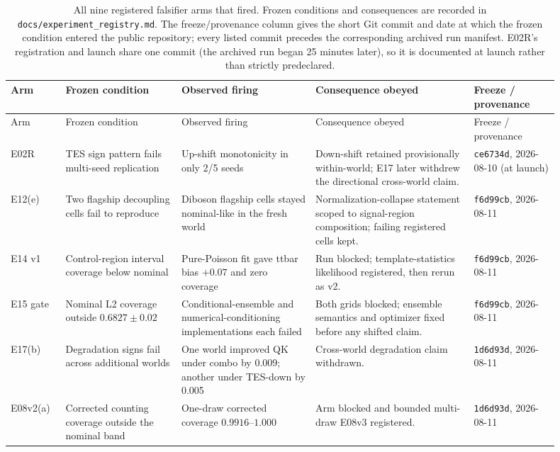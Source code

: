 \documentclass[11pt,a4paper]{article}
\begin{document}
\footnotesize
\begin{longtable}{@{}>{\raggedright\arraybackslash}p{0.09\linewidth}>{\raggedright\arraybackslash}p{0.19\linewidth}>{\raggedright\arraybackslash}p{0.22\linewidth}>{\raggedright\arraybackslash}p{0.26\linewidth}>{\raggedright\arraybackslash}p{0.14\linewidth}@{}}
\caption{All nine registered falsifier arms that fired. Frozen conditions and
consequences are recorded in \texttt{docs/experiment\_registry.md}. The
freeze/provenance column gives the short Git commit and date at which the
frozen condition entered the public repository; every listed commit precedes
the corresponding archived run manifest. E02R's registration and launch share
one commit (the archived run began 25 minutes later), so it is documented at
launch rather than strictly predeclared.}\label{tab:falsifiers}\\
\toprule
Arm & Frozen condition & Observed firing & Consequence obeyed & Freeze / provenance \\
\midrule
\endfirsthead
\toprule
Arm & Frozen condition & Observed firing & Consequence obeyed & Freeze / provenance \\
\midrule
\endhead
E02R & TES sign pattern fails multi-seed replication & Up-shift monotonicity in only 2/5 seeds & Down-shift retained provisionally within-world; E17 later withdrew the directional cross-world claim. & \texttt{ce6734d}, 2026-08-10 (at launch) \\
E12(e) & Two flagship decoupling cells fail to reproduce & Diboson flagship cells stayed nominal-like in the fresh world & Normalization-collapse statement scoped to signal-region composition; failing registered cells kept. & \texttt{f6d99cb}, 2026-08-11 \\
E14 v1 & Control-region interval coverage below nominal & Pure-Poisson fit gave ttbar bias $+0.07$ and zero coverage & Run blocked; template-statistics likelihood registered, then rerun as v2. & \texttt{f6d99cb}, 2026-08-11 \\
E15 gate & Nominal L2 coverage outside $0.6827\pm0.02$ & Conditional-ensemble and numerical-conditioning implementations each failed & Both grids blocked; ensemble semantics and optimizer fixed before any shifted claim. & \texttt{f6d99cb}, 2026-08-11 \\
E17(b) & Degradation signs fail across additional worlds & One world improved QK under combo by 0.009; another under TES-down by 0.005 & Cross-world degradation claim withdrawn. & \texttt{1d6d93d}, 2026-08-11 \\
E08v2(a) & Corrected counting coverage outside the nominal band & One-draw corrected coverage $0.9916$--$1.000$ & Arm blocked and bounded multi-draw E08v3 registered. & \texttt{1d6d93d}, 2026-08-11 \\

\end{longtable}
\end{document}
